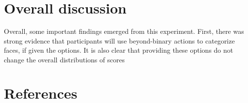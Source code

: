 \documentclass[
  man]{apa7}
\begin{document}
\hypertarget{overall-discussion}{%
\section{Overall discussion}\label{overall-discussion}}

Overall, some important findings emerged from this experiment. First, there was strong evidence that participants will use beyond-binary actions to categorize faces, if given the options. It is also clear that providing these options do not change the overall distributions of scores

\newpage

\hypertarget{references}{%
\section{References}\label{references}}
\end{document}
